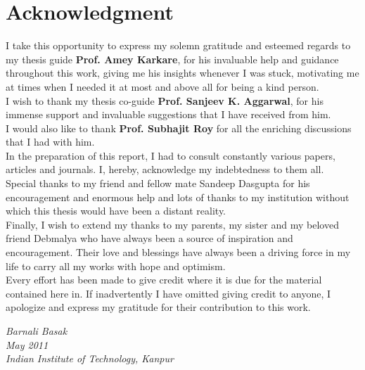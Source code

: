 \chapter*{Acknowledgment}
\vspace{1.0in}
I take this opportunity to express my solemn gratitude and esteemed regards to my thesis guide  
{\bf Prof. Amey Karkare}, for his invaluable help and guidance 
throughout this work, giving me his insights whenever I was 
stuck, motivating me at times when I needed it at most and 
above all for being a kind person.\\
I wish to thank my thesis co-guide {\bf Prof. Sanjeev K. Aggarwal}, for his 
immense support and invaluable suggestions 
that I have received from him. \\
I would also like to thank {\bf Prof. Subhajit Roy} for 
all the enriching discussions that I had with him.\\
In the preparation of this report, I had to consult constantly 
various papers, articles and journals. I, hereby, acknowledge 
my indebtedness to them all. \\
Special thanks to my friend and fellow mate Sandeep Dasgupta for his encouragement and enormous 
help and lots of thanks to my institution without which this 
thesis would have been a distant reality. \\
Finally, I wish to extend my thanks to my parents, my sister and my beloved 
friend Debmalya who have always been a source of inspiration 
and encouragement. Their love and blessings have always 
been a driving force in my life to carry all my works 
with hope and optimism.\\
Every effort has been made to give credit where it is due for
the material contained here in. If inadvertently I have
omitted giving credit to anyone, I apologize and express my
gratitude for their contribution to this work. 
\\
\begin{flushright} \large
\textit{Barnali Basak}\\
\textit{May 2011}\\
\textit{Indian Institute of Technology, Kanpur}\\
\end{flushright}
\newpage
